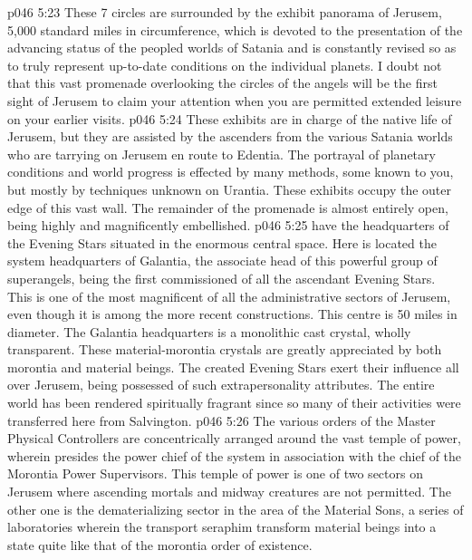 \vs p046 5:23 These 7 circles are surrounded by the exhibit panorama of Jerusem, 5,000 standard miles in circumference, which is devoted to the presentation of the advancing status of the peopled worlds of Satania and is constantly revised so as to truly represent up\hyp{}to\hyp{}date conditions on the individual planets. I doubt not that this vast promenade overlooking the circles of the angels will be the first sight of Jerusem to claim your attention when you are permitted extended leisure on your earlier visits.
\vs p046 5:24 These exhibits are in charge of the native life of Jerusem, but they are assisted by the ascenders from the various Satania worlds who are tarrying on Jerusem en route to Edentia. The portrayal of planetary conditions and world progress is effected by many methods, some known to you, but mostly by techniques unknown on Urantia. These exhibits occupy the outer edge of this vast wall. The remainder of the promenade is almost entirely open, being highly and magnificently embellished.
\vs p046 5:25 \bibnobreakspace {} have the headquarters of the Evening Stars situated in the enormous central space. Here is located the system headquarters of Galantia, the associate head of this powerful group of superangels, being the first commissioned of all the ascendant Evening Stars. This is one of the most magnificent of all the administrative sectors of Jerusem, even though it is among the more recent constructions. This centre is 50 miles in diameter. The Galantia headquarters is a monolithic cast crystal, wholly transparent. These material\hyp{}morontia crystals are greatly appreciated by both morontia and material beings. The created Evening Stars exert their influence all over Jerusem, being possessed of such extrapersonality attributes. The entire world has been rendered spiritually fragrant since so many of their activities were transferred here from Salvington.
\vs p046 5:26 \bibnobreakspace {} The various orders of the Master Physical Controllers are concentrically arranged around the vast temple of power, wherein presides the power chief of the system in association with the chief of the Morontia Power Supervisors. This temple of power is one of two sectors on Jerusem where ascending mortals and midway creatures are not permitted. The other one is the dematerializing sector in the area of the Material Sons, a series of laboratories wherein the transport seraphim transform material beings into a state quite like that of the morontia order of existence.
